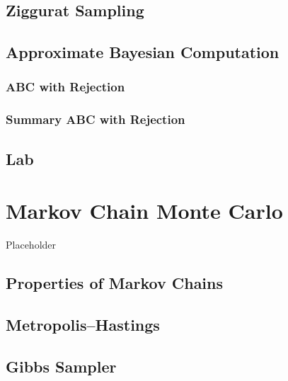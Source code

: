 \documentclass[
]{book}
\begin{document}
\hypertarget{ziggurat-sampling}{%
\section{Ziggurat Sampling}\label{ziggurat-sampling}}

\hypertarget{approximate-bayesian-computation}{%
\section{Approximate Bayesian Computation}\label{approximate-bayesian-computation}}

\hypertarget{abc-with-rejection}{%
\subsection{ABC with Rejection}\label{abc-with-rejection}}

\hypertarget{summary-abc-with-rejection}{%
\subsection{Summary ABC with Rejection}\label{summary-abc-with-rejection}}

\hypertarget{lab-1}{%
\section{Lab}\label{lab-1}}

\hypertarget{markov-chain-monte-carlo}{%
\chapter{Markov Chain Monte Carlo}\label{markov-chain-monte-carlo}}

Placeholder

\hypertarget{properties-of-markov-chains}{%
\section{Properties of Markov Chains}\label{properties-of-markov-chains}}

\hypertarget{metropolishastings}{%
\section{Metropolis--Hastings}\label{metropolishastings}}

\hypertarget{gibbs-sampler}{%
\section{Gibbs Sampler}\label{gibbs-sampler}}
\end{document}
